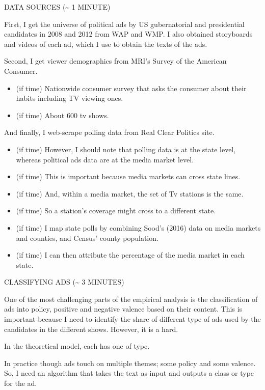 \documentclass[12pt]{article}
\theoremstyle{plain}
\theoremstyle{plain}
\theoremstyle{plain}
\theoremstyle{plain}
\theoremstyle{plain}
\theoremstyle{plain}
\begin{document}
\item DATA SOURCES (\textasciitilde{} 1 MINUTE)
\label{sec:org86b90cf}


First, I get the universe of political ads by US gubernatorial and presidential candidates in 2008 and 2012 from WAP and WMP.
I also obtained storyboards and videos of each ad, which I use to obtain the texts of the ads.

Second, I get viewer demographics from MRI's Survey of the American Consumer.
\begin{itemize}
\item (if time) Nationwide consumer survey that asks the consumer about their habits including TV viewing ones.
\item (if time) About 600 tv shows.
\end{itemize}

And finally, I web-scrape polling data from Real Clear Politics site.
\begin{itemize}
\item (if time) However, I should note that polling data is at the state level, whereas political ads data are at the media market level.
\item (if time) This is important because media markets can cross state lines.
\item (if time) And, within a media market, the set of Tv stations is the same.
\item (if time) So a station's coverage might cross to a different state.
\item (if time) I map state polls by combining Sood's (2016) data on media markets and counties, and Census' county population.
\item (if time) I can then attribute the percentage of the media market in each state.
\end{itemize}

\item CLASSIFYING ADS (\textasciitilde{} 3 MINUTES)
\label{sec:orgc5de24c}

One of the most challenging parts of the empirical analysis is the classification of ads into policy, positive and negative valence based on their content.
This is important because I need to identify the share of different type of ads used by the candidates in the different shows.
However, it is a hard.

In the theoretical model, each has one of type.

In practice though ads touch on multiple themes; some policy and some valence.
So, I need an algorithm that takes the text as input and outputs a class or type for the ad.
\end{document}

